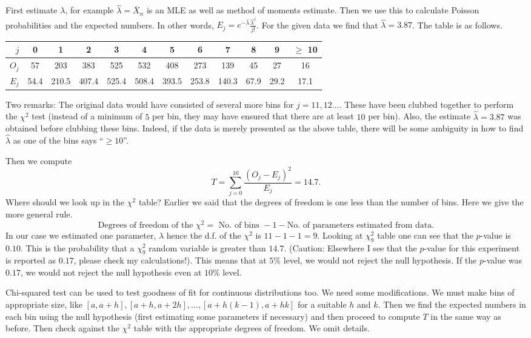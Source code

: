\documentclass[preprint,  11pt]{amsart}
\newcommand{\para}[1]{\vspace{4mm}\noindent{\bfseries #1:}}
\theoremstyle{plain} %
\theoremstyle{definition} %
\begin{document}
First estimate $\lambda$, for example $\hat{\lambda}=\overline{X}_{n}$ is an MLE as well as method of moments estimate. Then we use this to calculate Poisson probabilities and the expected numbers. In other words, $E_{j}=e^{-\hat{\lambda}}\frac{\hat{\lambda}^{j}}{j!}$. For the given data we find that $\hat{\lambda}=3.87$. The table is as follows.

\begin{center}
\begin{tabular}{||r|c|c|c|c|c|c|c|c|c|c|c||}
\hline
$j$  & 0 & 1 & 2 & 3 & 4 & 5 & 6 & 7 & 8 & 9 & $\ge$ 10 \\
\hline
$O_{j}$  & 57 & 203 & 383 & 525 & 532 & 408 & 273 & 139 & 45 & 27 & 16 \\
\hline
$E_{j}$ & 54.4 & 210.5 & 407.4 & 525.4 & 508.4 & 393.5 & 253.8 & 140.3 & 67.9 & 29.2 & 17.1 \\
\hline
\end{tabular}
\end{center}
Two remarks: The original data would have consisted of several more bins for $j=11,12\ldots$. These have been clubbed together to perform the $\chi^{2}$ test (instead of a minimum of $5$ per bin, they may have ensured that there are at least $10$ per bin). Also, the estimate $\hat{\lambda}=3.87$ was obtained before clubbing these bins. Indeed, if the data is merely presented as the above table, there will be some ambiguity in how to find $\hat{\lambda}$ as one of the bins says ``$\ge 10$''. 

Then we compute
$$
 T=\sum_{j=0}^{10}\frac{(O_{j}-E_{j})^{2}}{E_{j}} = 14.7.
$$
Where should we look up in the $\chi^{2}$ table? Earlier we said that the degrees of freedom is one less than the number of bins. Here we give the more general rule.
$$
\mbox{Degrees of freedom of the }\chi^{2} = \mbox{ No. of bins }-1-\mbox{No. of parameters estimated from data}.
$$
In our case we estimated one parameter, $\lambda$ hence the d.f. of the $\chi^{2}$ is $11-1-1=9$. Looking at $\chi_{9}^{2}$ table one can see that the $p$-value is $0.10$. This is the probability that a $\chi_{9}^{2}$ random variable is greater than $14.7$. (Caution: Elsewhere I see that the $p$-value for this experiment is reported as $0.17$, please check my calculations!). This means that at $5\%$ level, we would not reject the null hypothesis. If the $p$-value was $0.17$, we would not reject the null hypothesis even at $10\%$ level.  

\para{Fitting a continuous distribution} Chi-squared test can be used to test goodness of fit for continuous distributions too. We need some modifications. We must make bins of appropriate size, like $[a,a+h],[a+h,a+2h],\ldots ,[a+h(k-1),a+hk]$ for a suitable $h$ and $k$. Then we find the expected numbers in each bin using the null hypothesis (first estimating some parameters if necessary) and then proceed to compute $T$ in the same way as before. Then check against the $\chi^{2}$ table with the appropriate degrees of freedom. We omit details.
\end{document}
